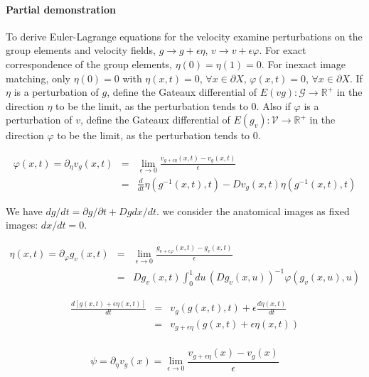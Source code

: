 \documentclass[preprint,review,8pt,times]{elsarticle}
\begin{document}
\paragraph{Partial demonstration}{To derive Euler-Lagrange equations for the velocity examine perturbations on the group elements and velocity fields, $g \rightarrow g + \epsilon \eta$, $v \rightarrow v + \epsilon \varphi$. For exact correspondence of the group elements, $\eta(0) = \eta(1) = 0$. For inexact image matching, only $\eta(0) = 0$ with $\eta(x, t) = 0$, $\forall x \in \partial X$, $\varphi(x, t) = 0$, $\forall x \in \partial X$. If $\eta$ is a perturbation of $g$, define the Gateaux differential of $E(v g): \mathcal{G} \rightarrow \mathbb{R}^{+}$ in the direction $\eta$ to be the limit, as the perturbation tends to 0. Also if $\varphi$ is a perturbation of $v$, define the Gateaux differential of $E(g_{v}): \mathcal{V} \rightarrow \mathbb{R}^{+}$ in the direction $\varphi$ to be the limit, as the perturbation tends to 0.

\begin{eqnarray*}
\varphi(x,t) = \partial_{\eta} v_{g}(x,t) & = & \underset{\epsilon \rightarrow 0}{\lim} \frac{v_{g+\epsilon \eta}(x,t) - v_{g}(x,t)}{\epsilon} \\
& = & \frac{d}{dt} \eta(g^{-1}(x,t),t) - D v_{g}(x,t) \eta (g^{-1}(x,t),t)
\end{eqnarray*}

We have $dg/dt = \partial g / \partial t + Dg dx/dt$. we consider the anatomical images as fixed images: $dx/dt = 0$.

\begin{eqnarray*}
\eta(x,t) = \partial_{\varphi} g_{v}(x,t) & = & \underset{\epsilon \rightarrow 0}{\lim} \frac{g_{v + \epsilon \varphi}(x,t) - g_{v}(x,t)}{\epsilon} \\
& = & Dg_{v}(x,t) \int_{0}^{1} du \, (Dg_{v}(x,u))^{-1} \varphi (g_{v}(x,u),u)
\end{eqnarray*}

\begin{eqnarray*}
\frac{d [g(x,t) + \epsilon \eta(x,t)]}{dt} & = & v_{g}(g(x,t), t) + \epsilon \frac{d \eta (x,t)}{dt} \\
& = & v_{g + \epsilon \eta} \left( g(x,t) + \epsilon \eta(x,t) \right) \\
\end{eqnarray*}

$$
\psi = \partial_{\eta} v_{g} (x) = \underset{\epsilon \rightarrow 0}{\lim} \frac{v_{g + \epsilon \eta}(x) - v_{g}(x)}{ \epsilon }
$$

}
\end{document}
